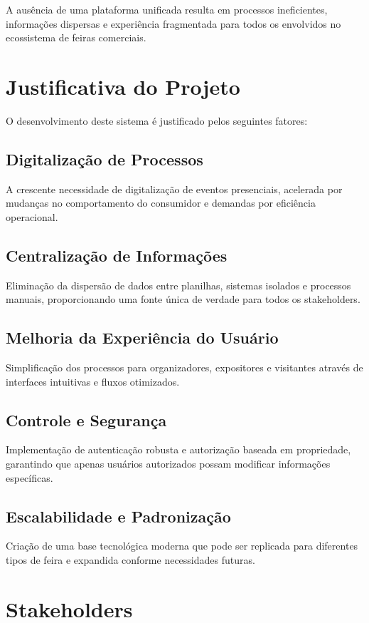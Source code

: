 \documentclass[12pt,a4paper]{article}
\begin{document}
A ausência de uma plataforma unificada resulta em processos ineficientes, informações dispersas e experiência fragmentada para todos os envolvidos no ecossistema de feiras comerciais.

\section{Justificativa do Projeto}

O desenvolvimento deste sistema é justificado pelos seguintes fatores:

\subsection{Digitalização de Processos}
A crescente necessidade de digitalização de eventos presenciais, acelerada por mudanças no comportamento do consumidor e demandas por eficiência operacional.

\subsection{Centralização de Informações}
Eliminação da dispersão de dados entre planilhas, sistemas isolados e processos manuais, proporcionando uma fonte única de verdade para todos os stakeholders.

\subsection{Melhoria da Experiência do Usuário}
Simplificação dos processos para organizadores, expositores e visitantes através de interfaces intuitivas e fluxos otimizados.

\subsection{Controle e Segurança}
Implementação de autenticação robusta e autorização baseada em propriedade, garantindo que apenas usuários autorizados possam modificar informações específicas.

\subsection{Escalabilidade e Padronização}
Criação de uma base tecnológica moderna que pode ser replicada para diferentes tipos de feira e expandida conforme necessidades futuras.

\section{Stakeholders}
\end{document}
